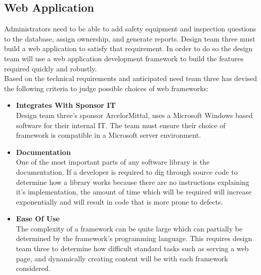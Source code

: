 \documentclass[Letter,11pt]{article}
\begin{document}
	\subsection{Web Application}\label{WEBAPP}
		Administrators need to be able to add safety equipment and inspection questions to the database, assign ownership, and generate reports. Design team three must build a web application to satisfy that requirement. In order to do so the design team will use a web application development framework to build the features required quickly and robustly.
		\\
		Based on the technical requirements and anticipated need team three has devised the following criteria to judge possible choices of web frameworks:
		\\
		\begin{minipage}[t]{0.5\textwidth}
		\begin{itemize}
			\item \textbf{Integrates With Sponsor IT}\\
			Design team three's sponsor ArcelorMittal, uses a Microsoft Windows based software for their internal IT. The team must ensure their choice of framework is compatible in a Microsoft server environment.

			\item \textbf{Documentation}\\
			One of the most important parts of any software library is the documentation. If a developer is required to dig through source code to determine how a library works because there are no instructions explaining it's implementation, the amount of time which will be required will increase exponentially and will result in code that is more prone to defects.

			\item \textbf{Ease Of Use} \\
			The complexity of a framework can be quite large which can partially be determined by the framework's programming language. This requires design team three to determine how difficult standard tasks such as serving a web page, and dynamically creating content will be with each framework considered.
		\end{itemize}
		\end{minipage}
\end{document}
